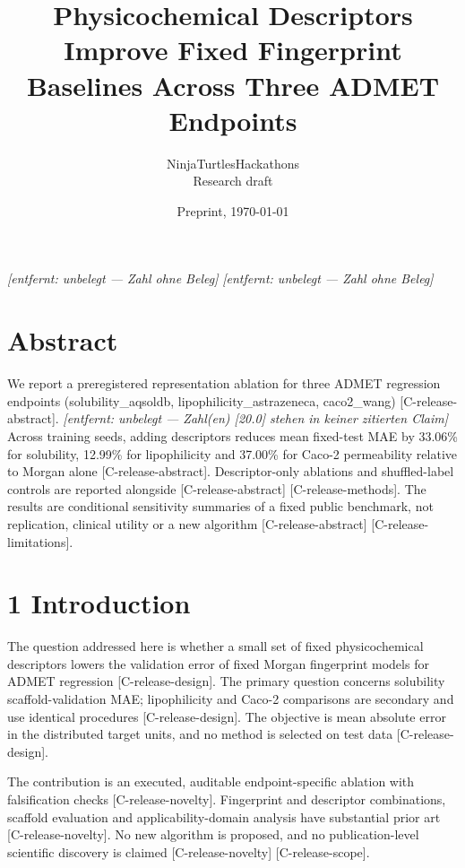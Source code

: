 \documentclass[10pt,twocolumn]{article}
\title{\textbf{Physicochemical Descriptors Improve Fixed Fingerprint Baselines Across Three ADMET Endpoints}}
\author{NinjaTurtlesHackathons\\ \small Research draft}
\date{Preprint, \today}
\begin{document}
\maketitle
\emph{[entfernt: unbelegt — Zahl ohne Beleg]} \emph{[entfernt: unbelegt — Zahl ohne Beleg]}

\section{Abstract}

We report a preregistered representation ablation for three ADMET regression endpoints (solubility_aqsoldb, lipophilicity_astrazeneca, caco2_wang) {\scriptsize[C-release-abstract]}. \emph{[entfernt: unbelegt — Zahl(en) [20.0] stehen in keiner zitierten Claim]} Across training seeds, adding descriptors reduces mean fixed-test MAE by 33.06\% for solubility, 12.99\% for lipophilicity and 37.00\% for Caco-2 permeability relative to Morgan alone {\scriptsize[C-release-abstract]}. Descriptor-only ablations and shuffled-label controls are reported alongside {\scriptsize[C-release-abstract]} {\scriptsize[C-release-methods]}. The results are conditional sensitivity summaries of a fixed public benchmark, not replication, clinical utility or a new algorithm {\scriptsize[C-release-abstract]} {\scriptsize[C-release-limitations]}.

\section{1 Introduction}

The question addressed here is whether a small set of fixed physicochemical descriptors lowers the validation error of fixed Morgan fingerprint models for ADMET regression {\scriptsize[C-release-design]}. The primary question concerns solubility scaffold-validation MAE; lipophilicity and Caco-2 comparisons are secondary and use identical procedures {\scriptsize[C-release-design]}. The objective is mean absolute error in the distributed target units, and no method is selected on test data {\scriptsize[C-release-design]}.

The contribution is an executed, auditable endpoint-specific ablation with falsification checks {\scriptsize[C-release-novelty]}. Fingerprint and descriptor combinations, scaffold evaluation and applicability-domain analysis have substantial prior art {\scriptsize[C-release-novelty]}. No new algorithm is proposed, and no publication-level scientific discovery is claimed {\scriptsize[C-release-novelty]} {\scriptsize[C-release-scope]}.
\end{document}
